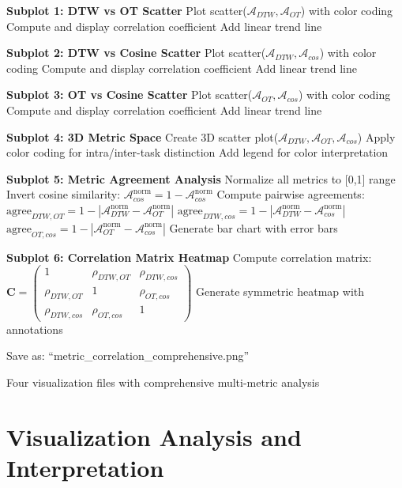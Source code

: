 \documentclass{article}
\begin{document}
\begin{algorithm}[H]
\begin{algorithmic}[1]
\STATE \textbf{Subplot 1: DTW vs OT Scatter}
\STATE Plot scatter($\mathcal{A}_{DTW}, \mathcal{A}_{OT}$) with color coding
\STATE Compute and display correlation coefficient
\STATE Add linear trend line

\STATE \textbf{Subplot 2: DTW vs Cosine Scatter}
\STATE Plot scatter($\mathcal{A}_{DTW}, \mathcal{A}_{cos}$) with color coding
\STATE Compute and display correlation coefficient
\STATE Add linear trend line

\STATE \textbf{Subplot 3: OT vs Cosine Scatter}
\STATE Plot scatter($\mathcal{A}_{OT}, \mathcal{A}_{cos}$) with color coding
\STATE Compute and display correlation coefficient
\STATE Add linear trend line

\STATE \textbf{Subplot 4: 3D Metric Space}
\STATE Create 3D scatter plot($\mathcal{A}_{DTW}, \mathcal{A}_{OT}, \mathcal{A}_{cos}$)
\STATE Apply color coding for intra/inter-task distinction
\STATE Add legend for color interpretation

\STATE \textbf{Subplot 5: Metric Agreement Analysis}
\STATE Normalize all metrics to [0,1] range
\STATE Invert cosine similarity: $\mathcal{A}_{cos}^{\text{norm}} = 1 - \mathcal{A}_{cos}^{\text{norm}}$
\STATE Compute pairwise agreements:
\STATE $\text{agree}_{DTW,OT} = 1 - |\mathcal{A}_{DTW}^{\text{norm}} - \mathcal{A}_{OT}^{\text{norm}}|$
\STATE $\text{agree}_{DTW,cos} = 1 - |\mathcal{A}_{DTW}^{\text{norm}} - \mathcal{A}_{cos}^{\text{norm}}|$
\STATE $\text{agree}_{OT,cos} = 1 - |\mathcal{A}_{OT}^{\text{norm}} - \mathcal{A}_{cos}^{\text{norm}}|$
\STATE Generate bar chart with error bars

\STATE \textbf{Subplot 6: Correlation Matrix Heatmap}
\STATE Compute correlation matrix:
\STATE $\mathbf{C} = \begin{pmatrix}
1 & \rho_{DTW,OT} & \rho_{DTW,cos} \\
\rho_{DTW,OT} & 1 & \rho_{OT,cos} \\
\rho_{DTW,cos} & \rho_{OT,cos} & 1
\end{pmatrix}$
\STATE Generate symmetric heatmap with annotations

\STATE Save as: ``metric\_correlation\_comprehensive.png''

\RETURN Four visualization files with comprehensive multi-metric analysis
\end{algorithmic}
\end{algorithm}

\section{Visualization Analysis and Interpretation}
\end{document}
